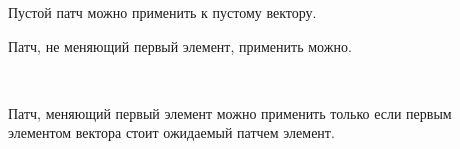 Пустой патч можно применить к пустому вектору.

\begin{code}%
\>[2]\<[4]%
\>[4] \AgdaSymbol{:}   \AgdaInductiveConstructor{[]}\<%
\end{code}

Патч, не меняющий первый элемент, применить можно.

\begin{code}%
\>[2]\<[4]%
\>[4] \AgdaSymbol{:}  \AgdaSymbol{\{}\AgdaSymbol{\}\{} \AgdaSymbol{:}  \AgdaSymbol{\}\{} \AgdaSymbol{:}  \AgdaSymbol{\}\{} \AgdaSymbol{:}   \AgdaSymbol{\}}\<%
\\
\>[4]\<[6]%
\>[6] \AgdaSymbol{(} \AgdaSymbol{:} \AgdaSymbol{)}      \AgdaSymbol{(} \AgdaSymbol{)}  \AgdaSymbol{(}  \AgdaSymbol{)}\<%
\end{code}

Патч, меняющий первый элемент можно применить только если первым
элементом вектора стоит ожидаемый патчем элемент.

\begin{code}%
\>[0]\<[4]%
\>[4] \AgdaSymbol{:}  \AgdaSymbol{\{}\AgdaSymbol{\}\{} \AgdaSymbol{:}  \AgdaSymbol{\}\{} \AgdaSymbol{:}  \AgdaSymbol{\}\{} \AgdaSymbol{:}   \AgdaSymbol{\}}\<%
\\
\>[4]\<[6]%
\>[6] \AgdaSymbol{(}  \AgdaSymbol{:} \AgdaSymbol{)}\<%
\\
\>[4]\<[6]%
\>[6]     \AgdaSymbol{(}     \AgdaSymbol{)}  \AgdaSymbol{(}  \AgdaSymbol{)}\<%
\end{code}

